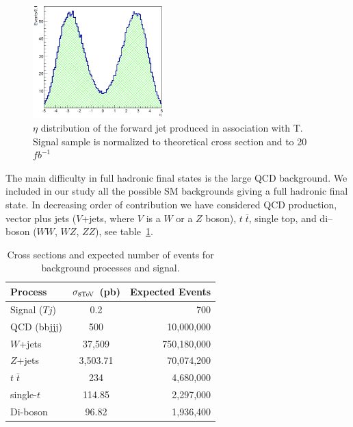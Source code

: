 \begin{figure}[!Hhtbp]
  \begin{center}
    \includegraphics[width=0.45\textwidth]{figs/Pheno/SixthJet.png}
    \caption{$\eta$ distribution of the forward jet produced in association with T. Signal sample is normalized to theoretical cross section and to 20 $fb^{-1}$}
    \label{fig:ForwJ}
  \end{center}
\end{figure}

The main difficulty in full hadronic final states is the large QCD background. We included in our study all the possible SM backgrounds giving a full hadronic final state. In decreasing order of contribution we have considered QCD production, vector plus jets ($V$+jets, where $V$ is a $W$ or a $Z$ boson), $t\; \bar{t}$, single top, and di--boson ($WW$, $WZ$, $ZZ$), see table~\ref{tab:xsec}. 

\begin{table}[htbH]
\begin{center}
\begin{tabular}{||l|c|r||}
  \hline\hline
  Process & $\sigma_{\rm 8 TeV}$ (pb) & Expected Events \\ \hline
 Signal ($Tj$) & 0.2 & 700 \\
 \hline
  QCD (bbjjj) & 500 & 10,000,000 \\
  $W$+jets & 37,509 & 750,180,000 \\
  $Z$+jets & 3,503.71 & 70,074,200 \\ 
  $t\; \bar{t}$ & 234 & 4,680,000 \\
  single-$t$ & 114.85 & 2,297,000 \\
  Di-boson & 96.82 & 1,936,400 \\
  \hline\hline
\end{tabular}
\caption{Cross sections and expected number of events for background processes and signal. \label{tab:xsec}}
\end{center}
\end{table}

